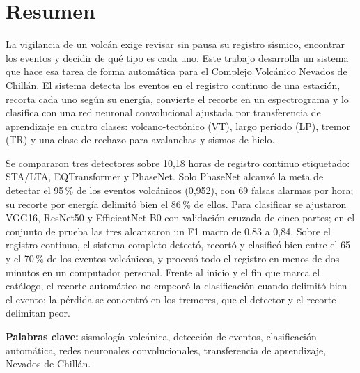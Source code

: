 \chapter*{Resumen}

La vigilancia de un volcán exige revisar sin pausa su registro sísmico,
encontrar los eventos y decidir de qué tipo es cada uno. Este trabajo
desarrolla un sistema que hace esa tarea de forma automática para el Complejo
Volcánico Nevados de Chillán. El sistema detecta los eventos en el registro
continuo de una estación, recorta cada uno según su energía, convierte el
recorte en un espectrograma y lo clasifica con una red neuronal convolucional
ajustada por transferencia de aprendizaje en cuatro clases: volcano-tectónico
(VT), largo período (LP), tremor (TR) y una clase de rechazo para avalanchas y
sismos de hielo.

Se compararon tres detectores sobre 10,18 horas de registro continuo
etiquetado: STA/LTA, EQTransformer y PhaseNet. Solo PhaseNet alcanzó la meta de
detectar el 95\,\% de los eventos volcánicos (0,952), con 69 falsas alarmas por
hora; su recorte por energía delimitó bien el 86\,\% de ellos. Para clasificar
se ajustaron VGG16, ResNet50 y EfficientNet-B0 con validación cruzada de cinco
partes; en el conjunto de prueba las tres alcanzaron un F1 macro de 0,83 a
0,84. Sobre el
registro continuo, el sistema completo detectó, recortó y clasificó bien entre
el 65 y el 70\,\% de los eventos volcánicos, y procesó todo el registro en menos
de dos minutos en un computador personal. Frente al inicio y el fin que marca el
catálogo, el recorte automático no empeoró la clasificación cuando delimitó
bien el evento; la pérdida se concentró en los tremores, que el detector y el
recorte delimitan peor.

\vspace{0.5cm}
\noindent\textbf{Palabras clave:} sismología volcánica, detección de
eventos, clasificación automática, redes neuronales convolucionales,
transferencia de aprendizaje, Nevados de Chillán.
